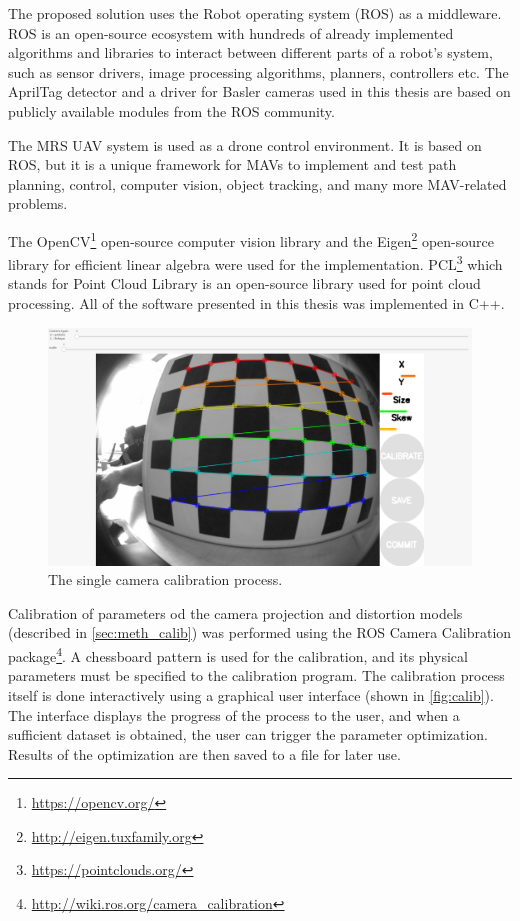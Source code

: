The proposed solution uses the Robot operating system (ROS) \cite{Rospaper} as a middleware.
ROS is an open-source ecosystem with hundreds of already implemented algorithms and libraries to interact between different parts of a robot's system, such as sensor drivers, image processing algorithms, planners, controllers etc.
The AprilTag detector and a driver for Basler cameras used in this thesis are based on publicly available modules from the ROS community.

The MRS UAV system \cite{Baca2021} is used as a drone control environment. It is based on ROS, but it is a unique framework for MAVs to implement and test path planning, control, computer vision, object tracking, and many more MAV-related problems.

The OpenCV\footnote{\url{https://opencv.org/}} open-source computer vision library and the Eigen\footnote{\url{http://eigen.tuxfamily.org}} open-source library for efficient linear algebra were used for the implementation.
PCL\footnote{\url{https://pointclouds.org/}} which stands for Point Cloud Library is an open-source library used for point cloud processing.
All of the software presented in this thesis was implemented in C++.

\begin{figure}[ht]
    \centering
    \includegraphics[width=.6\textwidth]{graphics/calibration.png}
    \caption{The single camera calibration process.}
    \label{fig:calib}
\end{figure}

Calibration of parameters od the camera projection and distortion models (described in \autoref{sec:meth_calib}) was performed using the ROS Camera Calibration package\footnote{\url{http://wiki.ros.org/camera_calibration}}.
A chessboard pattern is used for the calibration, and its physical parameters must be specified to the calibration program.
The calibration process itself is done interactively using a graphical user interface (shown in \autoref{fig:calib}).
The interface displays the progress of the process to the user, and when a sufficient dataset is obtained, the user can trigger the parameter optimization. 
Results of the optimization are then saved to a file for later use.

